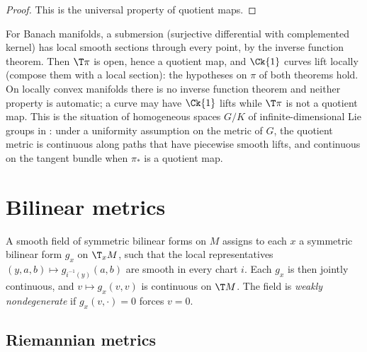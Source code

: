 \begin{proof}
  \leanok
  This is the universal property of quotient maps.
\end{proof}

\begin{remark}
  For Banach manifolds, a submersion (surjective differential with complemented kernel) has local
  smooth sections through every point, by the inverse function theorem. Then $\T\pi$ is open,
  hence a quotient map, and $\Ck{1}$ curves lift locally (compose them with a local section): the
  hypotheses on $\pi$ of both theorems hold. On locally convex manifolds there is no inverse
  function theorem and neither property is automatic; a curve may have $\Ck{1}$ lifts while
  $\T\pi$ is not a quotient map. This is the situation of homogeneous spaces $G/K$ of
  infinite-dimensional Lie groups in \cite[Lemma~3.19]{Lar19}: under a uniformity assumption on
  the metric of $G$, the quotient metric is continuous along paths that have piecewise smooth
  lifts, and continuous on the tangent bundle when $\pi_*$ is a quotient map.
\end{remark}

\section{Bilinear metrics}

\begin{definition}
  \label{def:mt-bilin}
  \leanok
  A smooth field of symmetric bilinear forms on $M$ assigns to each $x$ a symmetric bilinear form
  $g_x$ on $\T_x M$, such that the local representatives $(y, a, b) \mapsto g_{i^{-1}(y)}(a, b)$ are
  smooth in every chart $i$. Each $g_x$ is then jointly continuous, and $v \mapsto g_x(v,v)$ is
  continuous on $\T M$. The field is \emph{weakly nondegenerate} if $g_x(v, \cdot) = 0$ forces
  $v = 0$.
\end{definition}

\subsection{Riemannian metrics}

